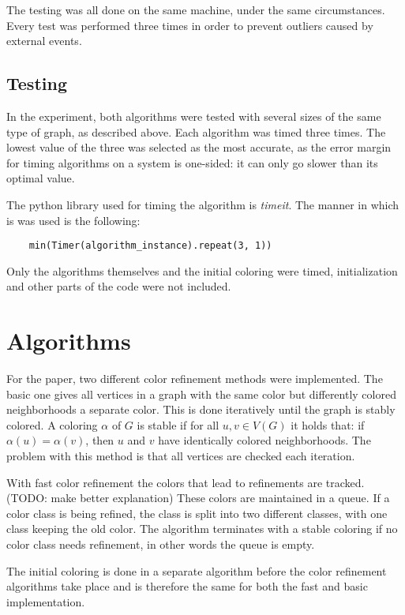 \documentclass[twoside]{article}
\begin{document}
\begin{multicols}{2}
The testing was all done on the same machine, under the same circumstances. Every test was performed three times in order to prevent outliers caused by external events.

\subsection{Testing}
\label{methods:testing}
In the experiment, both algorithms were tested with several sizes of the same type of graph, as described above. Each algorithm was timed three times. The lowest value of the three was selected as the most accurate, as the error margin for timing algorithms on a system is one-sided: it can only go slower than its optimal value.

The python library used for timing the algorithm is \emph{timeit}. The manner in which is was used is the following:
\begin{lstlisting}
	min(Timer(algorithm_instance).repeat(3, 1))
\end{lstlisting}

Only the algorithms themselves and the initial coloring were timed, initialization and other parts of the code were not included.

\section{Algorithms}
\label{algs}
For the paper, two different color refinement methods were implemented. The basic one gives all vertices in a graph with the same color but differently colored neighborhoods a separate color. This is done iteratively until the graph is stably colored. A coloring $\alpha$ of $G$ is stable if for all $u, v \in V(G)$ it holds that: if $\alpha(u) = \alpha(v)$, then $u$ and $v$ have identically colored neighborhoods. The problem with this method is that all vertices are checked each iteration. 

With fast color refinement the colors that lead to refinements are tracked.(TODO: make better explanation) These colors are maintained in a queue. If a color class is being refined, the class is split into two different classes, with one class keeping the old color. The algorithm terminates with a stable coloring if no color class needs refinement, in other words the queue is empty. 

The initial coloring is done in a separate algorithm before the color refinement algorithms take place and is therefore the same for both the fast and basic implementation.


\end{multicols}
\end{document}
